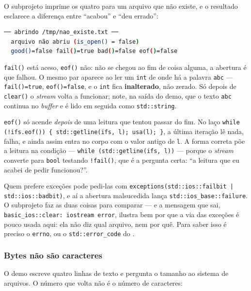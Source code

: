 O subprojeto imprime os quatro para um arquivo que não existe, e o resultado
esclarece a diferença entre ``acabou'' e ``deu errado'':

\begin{lstlisting}[style=bt, language=bash,
    caption={Saída medida de \texttt{dist/bin/file\_io}, demo 2, seção 5.}]
── abrindo /tmp/nao_existe.txt ──
  arquivo não abriu (is_open() = false)
  good()=false fail()=true bad()=false eof()=false
\end{lstlisting}

\texttt{fail()} está aceso, \texttt{eof()} não: não se chegou ao fim de coisa
alguma, a abertura é que falhou. O mesmo par aparece ao ler um \texttt{int} de
onde há a palavra \texttt{abc} --- \texttt{fail()=true}, \texttt{eof()=false},
e o \texttt{int} fica \textbf{inalterado}, não zerado. Só depois de
\texttt{clear()} o \emph{stream} volta a funcionar; note, na saída do demo, que
o texto \texttt{abc} continua no \emph{buffer} e é lido em seguida como
\texttt{std::string}.

\begin{armadilha}
\texttt{eof()} só acende \emph{depois} de uma leitura que tentou passar do fim.
No laço \texttt{while (!ifs.eof()) \{ std::getline(ifs, l); usa(l); \}}, a
última iteração lê nada, falha, e ainda assim entra no corpo com o valor antigo
de \texttt{l}. A forma correta põe a leitura na condição ---
\texttt{while (std::getline(ifs, l))} --- porque o \emph{stream} converte para
\texttt{bool} testando \texttt{!fail()}, que é a pergunta certa: ``a leitura que
eu acabei de pedir funcionou?''.
\end{armadilha}

Quem prefere exceções pode pedi-las com \texttt{exceptions(std::ios::failbit |
std::ios::badbit)}, e aí a abertura malsucedida lança
\texttt{std::ios\_base::failure}. O subprojeto faz as duas coisas para
comparar --- e a mensagem que sai, \texttt{basic\_ios::clear: iostream error},
ilustra bem por que a via das exceções é pouco usada aqui: ela não diz qual
arquivo, nem por quê. Para saber isso é preciso o \texttt{errno}, ou o
\texttt{std::error\_code} do .

\subsubsection{Bytes não são caracteres}

O demo escreve quatro linhas de texto e pergunta o tamanho ao sistema de
arquivos. O número que volta não é o número de caracteres:

